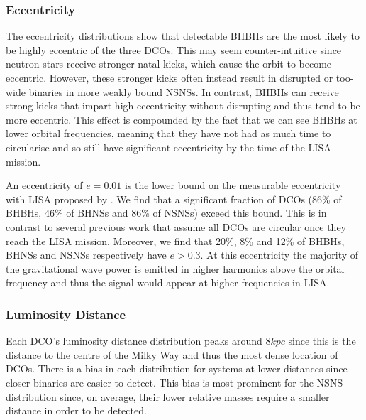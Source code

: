 \subsubsection{Eccentricity}
The eccentricity distributions show that detectable BHBHs are the most likely to be highly eccentric of the three DCOs. This may seem counter-intuitive since neutron stars receive stronger natal kicks, which cause the orbit to become eccentric. However, these stronger kicks often instead result in disrupted or too-wide binaries in more weakly bound NSNSs. In contrast, BHBHs can receive strong kicks that impart high eccentricity without disrupting and thus tend to be more eccentric. This effect is compounded by the fact that we can see BHBHs at lower orbital frequencies, meaning that they have not had as much time to circularise and so still have significant eccentricity by the time of the LISA mission.

An eccentricity of $e = 0.01$ is the lower bound on the measurable eccentricity with LISA proposed by \citet{Nishizawa+2016}. We find that a significant fraction of DCOs (86\% of BHBHs, 46\% of BHNSs and 86\% of NSNSs) exceed this bound. This is in contrast to several previous work that assume all DCOs are circular once they reach the LISA mission. Moreover, we find that 20\%, 8\% and 12\% of BHBHs, BHNSs and NSNSs respectively have $e > 0.3$. At this eccentricity the majority of the gravitational wave power is emitted in higher harmonics above the orbital frequency and thus the signal would appear at higher frequencies in LISA. 

\subsubsection{Luminosity Distance}
Each DCO's luminosity distance distribution peaks around $8 \unit{kpc}$ since this is the distance to the centre of the Milky Way and thus the most dense location of DCOs. There is a bias in each distribution for systems at lower distances since closer binaries are easier to detect. This bias is most prominent for the NSNS distribution since, on average, their lower relative masses require a smaller distance in order to be detected.

